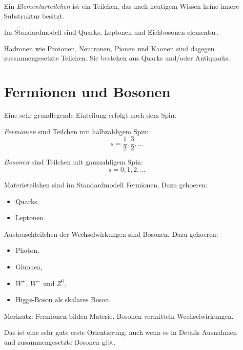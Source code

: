 \begin{definitionbox}
Ein \emph{Elementarteilchen} ist ein Teilchen, das nach heutigem Wissen keine innere
Substruktur besitzt.
\end{definitionbox}

\begin{conceptbox}
Im Standardmodell sind Quarks, Leptonen und Eichbosonen elementar.

Hadronen wie Protonen, Neutronen, Pionen und Kaonen sind dagegen zusammengesetzte
Teilchen.
Sie bestehen aus Quarks und/oder Antiquarks.
\end{conceptbox}

\section{Fermionen und Bosonen}

Eine sehr grundlegende Einteilung erfolgt nach dem Spin.

\begin{definitionbox}
\emph{Fermionen} sind Teilchen mit halbzahligem Spin:
\[
    s=\frac{1}{2},\frac{3}{2},\ldots
\]

\emph{Bosonen} sind Teilchen mit ganzzahligem Spin:
\[
    s=0,1,2,\ldots
\]
\end{definitionbox}

\begin{conceptbox}
Materieteilchen sind im Standardmodell Fermionen.
Dazu gehoeren:
\begin{itemize}
    \item Quarks,
    \item Leptonen.
\end{itemize}

Austauschteilchen der Wechselwirkungen sind Bosonen.
Dazu gehoeren:
\begin{itemize}
    \item Photon,
    \item Gluonen,
    \item $W^+$, $W^-$ und $Z^0$,
    \item Higgs-Boson als skalares Boson.
\end{itemize}
\end{conceptbox}

\begin{examtipbox}
Merksatz:
Fermionen bilden Materie.
Bosonen vermitteln Wechselwirkungen.

Das ist eine sehr gute erste Orientierung, auch wenn es in Details Ausnahmen und
zusammengesetzte Bosonen gibt.
\end{examtipbox}

